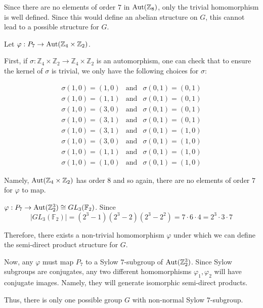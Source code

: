 \documentclass[12pt]{AlgebraQual}
\begin{document}
\begin{solution}
\begin{enumerate}[label=(\alph*)]
    Since there are no elements of order $7$ in $\text{Aut}(\mathbb{Z}_8)$, only the trivial homomorphism is well defined. Since this would define an abelian structure on $G$, this cannot lead to a possible structure for $G.$

     Let $\varphi:P_7\to\text{Aut}(\mathbb{Z}_4\times\mathbb{Z}_2)$.

    First, if $\sigma:\mathbb{Z}_4\times\mathbb{Z}_2\to\mathbb{Z}_4\times\mathbb{Z}_2$ is an automorphism, one can check that to ensure the kernel of $\sigma$ is trivial, we only have the following choices for $\sigma:$

    $$\begin{matrix}
    \sigma(1,0)=(1,0) &\text{and}& \sigma(0,1)=(0,1)\\
    \sigma(1,0)=(1,1) &\text{and}& \sigma(0,1)=(0,1)\\
    \sigma(1,0)=(3,0) &\text{and}& \sigma(0,1)=(0,1)\\
    \sigma(1,0)=(3,1) &\text{and}& \sigma(0,1)=(0,1)\\
    \sigma(1,0)=(3,1) &\text{and}& \sigma(0,1)=(1,0)\\
    \sigma(1,0)=(3,0) &\text{and}& \sigma(0,1)=(1,0)\\
    \sigma(1,0)=(1,1) &\text{and}& \sigma(0,1)=(1,0)\\
    \sigma(1,0)=(1,0) &\text{and}& \sigma(0,1)=(1,0)
    \end{matrix}$$

    Namely, $\text{Aut}(\mathbb{Z}_4\times\mathbb{Z}_2)$ has order $8$ and so again, there are no elements of order $7$ for $\varphi$ to map.

     $\varphi:P_7\to\text{Aut}(\mathbb{Z}_2^3)\cong GL_3(\mathbb{F}_2)$. Since $$|GL_3(\mathbb{F}_2)|=(2^3-1)(2^3-2)(2^3-2^2)=7\cdot6\cdot4=2^3\cdot 3\cdot 7$$

    Therefore, there exists a non-trivial homomorphism $\varphi$ under which we can define the semi-direct product structure for $G.$

    Now, any $\varphi$ must map $P_7$ to a Sylow $7$-subgroup of $\text{Aut}(\mathbb{Z}_2^3)$. Since Sylow subgroups are conjugates, any two different homomorphisms $\varphi_1,\varphi_2$ will have conjugate images. Namely, they will generate isomorphic semi-direct products.

    Thus, there is only one possible group $G$ with non-normal Sylow $7$-subgroup.


\end{enumerate}
\end{solution}
\end{document}
